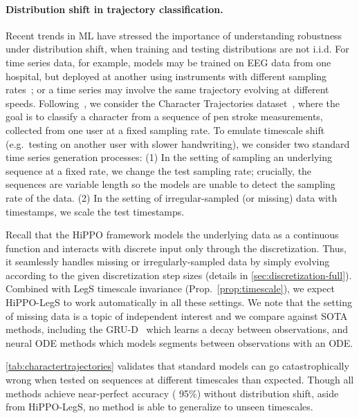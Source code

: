 \documentclass{article}
\begin{document}
\paragraph{Distribution shift in trajectory classification.}
Recent trends in ML have stressed the importance of understanding robustness under distribution shift, when training and testing distributions are not i.i.d.
For time series data, for example, models may be trained on EEG data from one hospital, but deployed at another using instruments with different sampling rates~\citep{shah2018temple, saab2020weak}; or a time series may involve the same trajectory evolving at different speeds.
Following~\citet{kidger2020neural}, we consider the Character Trajectories dataset~\citep{bagnall2018uea},
where the goal is to classify a character from a sequence of pen stroke measurements, collected from one user at a fixed sampling rate.
To emulate timescale shift (e.g.\ testing on another user with slower handwriting),
we consider two standard time series generation processes:
(1) In the setting of sampling an underlying sequence at a fixed rate, we change the test sampling rate; crucially, the sequences are variable length so the models are unable to detect the sampling rate of the data.
(2) In the setting of irregular-sampled (or missing) data with timestamps, we scale the test timestamps.





Recall that the HiPPO framework models the underlying data as a continuous function and interacts with discrete input only through the discretization.
Thus, it seamlessly handles missing or irregularly-sampled data by simply evolving according to the given discretization step sizes (details in \cref{sec:discretization-full}).
Combined with LegS timescale invariance (Prop.~\ref{prop:timescale}), we expect HiPPO-LegS to work automatically in all these settings.
We note that the setting of missing data is a topic of independent interest and we compare against SOTA methods, including the GRU-D~\cite{che2018recurrent} which learns a decay between observations,
and neural ODE methods which models segments between observations with an ODE.

\cref{tab:charactertrajectories} validates that standard models can go catastrophically wrong when tested on sequences at different timescales than expected.
Though all methods achieve near-perfect accuracy ( 95\%) without distribution shift,
aside from HiPPO-LegS, no method is able to generalize to unseen timescales.
\end{document}
